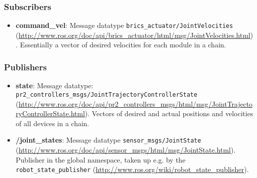 \subsubsection{Subscribers}

\begin{itemize}
\item {\bf command\_vel}: Message datatype \texttt{brics\_actuator/JointVelocities} (\url{http://www.ros.org/doc/api/brics_actuator/html/msg/JointVelocities.html}). Essentially a vector of desired velocities for each module in a chain.
\end{itemize}

\subsubsection{Publishers}

\begin{itemize}
\item {\bf state}: Message datatype: \texttt{pr2\_controllers\_msgs/JointTrajectoryControllerState} (\url{http://www.ros.org/doc/api/pr2_controllers_msgs/html/msg/JointTrajectoryControllerState.html}). Vectors of desired and actual positions and velocities of all devices in a chain.
\item {\bf /joint\_states}: Message datatype \texttt{sensor\_msgs/JointState} (\url{http://www.ros.org/doc/api/sensor_msgs/html/msg/JointState.html}). Publisher in the global namespace, taken up e.g. by the \texttt{robot\_state\_publisher} (\url{http://www.ros.org/wiki/robot_state_publisher}).
\end{itemize}


